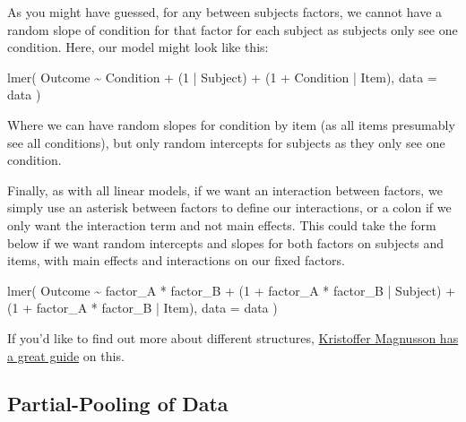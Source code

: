 \documentclass[
]{book}
\newenvironment{Shaded}{\begin{snugshade}}{\end{snugshade}}
\newcommand{\AttributeTok}[1]{\textcolor[rgb]{0.77,0.63,0.00}{#1}}
\newcommand{\DecValTok}[1]{\textcolor[rgb]{0.00,0.00,0.81}{#1}}
\newcommand{\FunctionTok}[1]{\textcolor[rgb]{0.00,0.00,0.00}{#1}}
\newcommand{\NormalTok}[1]{#1}
\newcommand{\SpecialCharTok}[1]{\textcolor[rgb]{0.00,0.00,0.00}{#1}}
\begin{document}
As you might have guessed, for any between subjects factors, we cannot have a random slope of condition for that factor for each subject as subjects only see one condition. Here, our model might look like this:

\begin{Shaded}
\begin{Highlighting}[]
\FunctionTok{lmer}\NormalTok{(}
\NormalTok{  Outcome }\SpecialCharTok{\textasciitilde{}}\NormalTok{ Condition }\SpecialCharTok{+} 
\NormalTok{    (}\DecValTok{1} \SpecialCharTok{|}\NormalTok{ Subject) }\SpecialCharTok{+} 
\NormalTok{    (}\DecValTok{1} \SpecialCharTok{+}\NormalTok{ Condition }\SpecialCharTok{|}\NormalTok{ Item), }
  \AttributeTok{data =}\NormalTok{ data}
\NormalTok{  )}
\end{Highlighting}
\end{Shaded}

Where we can have random slopes for condition by item (as all items presumably see all conditions), but only random intercepts for subjects as they only see one condition.

Finally, as with all linear models, if we want an interaction between factors, we simply use an asterisk between factors to define our interactions, or a colon if we only want the interaction term and not main effects. This could take the form below if we want random intercepts and slopes for both factors on subjects and items, with main effects and interactions on our fixed factors.

\begin{Shaded}
\begin{Highlighting}[]
\FunctionTok{lmer}\NormalTok{(}
\NormalTok{  Outcome }\SpecialCharTok{\textasciitilde{}}\NormalTok{ factor\_A }\SpecialCharTok{*}\NormalTok{ factor\_B }\SpecialCharTok{+} 
\NormalTok{    (}\DecValTok{1} \SpecialCharTok{+}\NormalTok{ factor\_A }\SpecialCharTok{*}\NormalTok{ factor\_B }\SpecialCharTok{|}\NormalTok{ Subject) }\SpecialCharTok{+} 
\NormalTok{    (}\DecValTok{1} \SpecialCharTok{+}\NormalTok{ factor\_A }\SpecialCharTok{*}\NormalTok{ factor\_B }\SpecialCharTok{|}\NormalTok{ Item), }
  \AttributeTok{data =}\NormalTok{ data}
\NormalTok{  )}
\end{Highlighting}
\end{Shaded}

If you'd like to find out more about different structures, \href{http://rpsychologist.com/r-guide-longitudinal-lme-lmer}{Kristoffer Magnusson has a great guide} on this.

\hypertarget{partial-pooling-of-data}{%
\subsection{Partial-Pooling of Data}\label{partial-pooling-of-data}}
\end{document}
